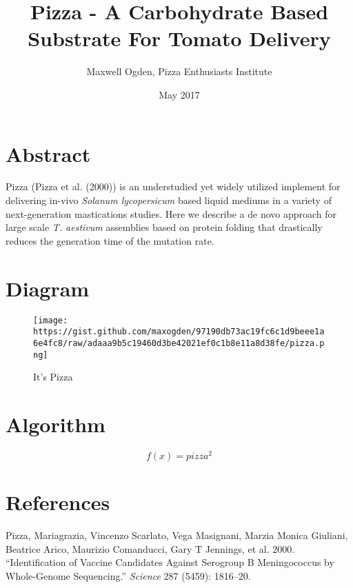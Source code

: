 \documentclass[
  a4paperpaper,
  twocolumn]{article}
\title{Pizza - A Carbohydrate Based Substrate For Tomato Delivery}
\author{Maxwell Ogden, Pizza Enthusiasts Institute}
\date{May 2017}
\begin{document}
\maketitle

\hypertarget{abstract}{%
\section{Abstract}\label{abstract}}

Pizza (Pizza et al. (2000)) is an understudied yet widely utilized
implement for delivering in-vivo \emph{Solanum lycopersicum} based
liquid mediums in a variety of next-generation mastications studies.
Here we describe a de novo approach for large scale \emph{T. aestivum}
assemblies based on protein folding that drastically reduces the
generation time of the mutation rate.

\hypertarget{diagram}{%
\section{Diagram}\label{diagram}}

\begin{figure}
\centering
\texttt{[image: https://gist.github.com/maxogden/97190db73ac19fc6c1d9beee1a6e4fc8/raw/adaaa9b5c19460d3be42021ef0c1b8e11a8d38fe/pizza.png]}
\caption{It's Pizza}
\end{figure}

\hypertarget{algorithm}{%
\section{Algorithm}\label{algorithm}}

\[f(x)=pizza^2\]

\hypertarget{references}{%
\section*{References}\label{references}}

\hypertarget{refs}{}
\leavevmode\hypertarget{ref-pizza2000identification}{}%
Pizza, Mariagrazia, Vincenzo Scarlato, Vega Masignani, Marzia Monica
Giuliani, Beatrice Arico, Maurizio Comanducci, Gary T Jennings, et al.
2000. ``Identification of Vaccine Candidates Against Serogroup B
Meningococcus by Whole-Genome Sequencing.'' \emph{Science} 287 (5459):
1816--20.
\end{document}
